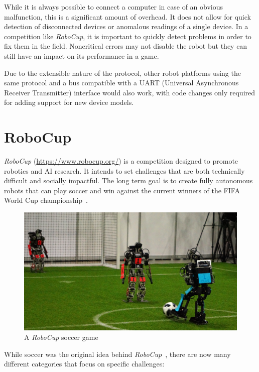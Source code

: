 While it is always possible to connect a computer in case of an obvious malfunction, this is a
significant amount of overhead. It does not allow for quick detection of disconnected devices
or anomalous readings of a single device. In a competition like \textit{RoboCup}, it is important
to quickly detect problems in order to fix them in the field. Noncritical errors may not disable
the robot but they can still have an impact on its performance in a game.

Due to the extensible nature of the protocol, other robot platforms using the same protocol and
a bus compatible with a UART (Universal Asynchronous Receiver Transmitter) interface would also
work, with code changes only required for adding support for new device models.

\section{RoboCup}
\label{introduction/robocup}

\textit{RoboCup} (\url{https://www.robocup.org/}) is a competition designed to promote robotics and
AI research. It intends to set challenges that are both technically difficult and socially impactful.
The long term goal is to create fully autonomous robots that can play soccer and win against the
current winners of the FIFA World Cup championship~\cite{robocup-objective}.

\begin{figure}[h]
    \centering
    \includegraphics[scale=1.5]{img/robocup_game.png}
    \caption{A \textit{RoboCup} soccer game}
\end{figure}

While soccer was the original idea behind \textit{RoboCup}~\cite{robocup-history}, there are now many
different categories that focus on specific challenges:

